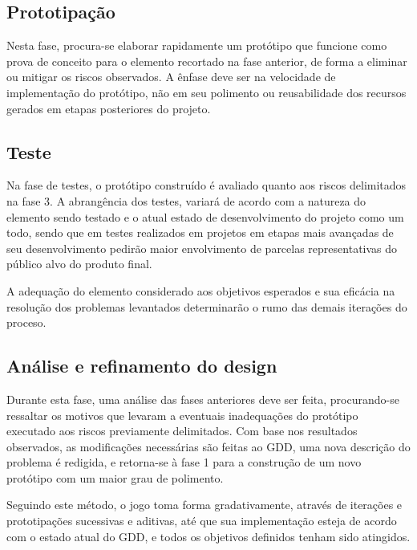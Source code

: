\subsection{Prototipação}\label{subsec-met-prototipacao}

Nesta fase, procura-se elaborar rapidamente um protótipo que funcione como prova de conceito para o elemento recortado na fase anterior, de forma a eliminar ou mitigar os riscos observados. A ênfase deve ser na velocidade de implementação do protótipo, não em seu polimento ou reusabilidade dos recursos gerados em etapas posteriores do projeto.

\subsection{Teste}\label{subsec-met-teste}

Na fase de testes, o protótipo construído é avaliado quanto aos riscos delimitados na fase 3. A abrangência dos testes, variará de acordo com a natureza do elemento sendo testado e o atual estado de desenvolvimento do projeto como um todo, sendo que em testes realizados em projetos em etapas mais avançadas de seu desenvolvimento pedirão maior envolvimento de parcelas representativas do público alvo do produto final.

A adequação do elemento considerado aos objetivos esperados e sua eficácia na resolução dos problemas levantados determinarão o rumo das demais iterações do proceso.

\subsection{Análise e refinamento do design}\label{subsec-met-analise-refinamento}

Durante esta fase, uma análise das fases anteriores deve ser feita, procurando-se ressaltar os motivos que levaram a eventuais inadequações do protótipo executado aos riscos previamente delimitados. Com base nos resultados observados, as modificações necessárias são feitas ao GDD, uma nova descrição do problema é redigida, e retorna-se à fase 1 para a construção de um novo protótipo com um maior grau de polimento.

Seguindo este método, o jogo toma forma gradativamente, através de iterações e prototipações sucessivas e aditivas, até que sua implementação esteja de acordo com o estado atual do GDD, e todos os objetivos definidos tenham sido atingidos.

